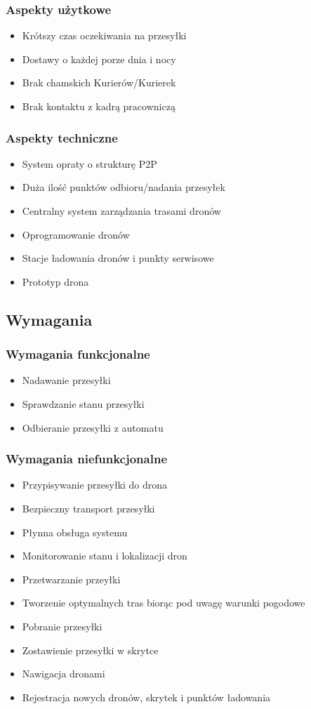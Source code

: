 \documentclass[12pt]{article}
\begin{document}
\subsubsection{Aspekty użytkowe}
\begin{itemize}
\item Krótszy czas oczekiwania na przesyłki
\item Dostawy o każdej porze dnia i nocy
\item Brak chamskich Kurierów/Kurierek
\item Brak kontaktu z kadrą pracowniczą
\end{itemize}

\subsubsection{Aspekty techniczne}
\begin{itemize}
\item System opraty o strukturę P2P
\item Duża ilość punktów odbioru/nadania przesyłek
\item Centralny system zarządzania trasami dronów
\item Oprogramowanie dronów
\item Stacje ładowania dronów i punkty serwisowe
\item Prototyp drona
\end{itemize}

\subsection{Wymagania}
\subsubsection{Wymagania funkcjonalne}
\begin{itemize}
\item Nadawanie przesyłki
\item Sprawdzanie stanu przesyłki
\item Odbieranie przesyłki z automatu
\end{itemize}
\subsubsection{Wymagania niefunkcjonalne}
\begin{itemize}
\item Przypisywanie przesyłki do drona
\item Bezpieczny transport przesyłki
\item Płynna obsługa systemu
\item Monitorowanie stanu i lokalizacji dron
\item Przetwarzanie przeyłki
\item Tworzenie optymalnych tras biorąc pod uwagę warunki pogodowe
\item Pobranie przesyłki
\item Zostawienie przesyłki w skrytce
\item Nawigacja dronami
\item Rejestracja nowych dronów, skrytek i punktów ładowania
\end{itemize}
\end{document}
